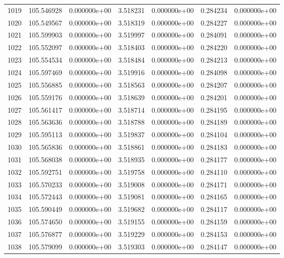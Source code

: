 \begin{tabular}{rrrrrrr}
1019 & 105.546928 &  0.000000e+00 &  3.518231 &  0.000000e+00 &   0.284234 &  0.000000e+00 \\
1020 & 105.549567 &  0.000000e+00 &  3.518319 &  0.000000e+00 &   0.284227 &  0.000000e+00 \\
1021 & 105.599903 &  0.000000e+00 &  3.519997 &  0.000000e+00 &   0.284091 &  0.000000e+00 \\
1022 & 105.552097 &  0.000000e+00 &  3.518403 &  0.000000e+00 &   0.284220 &  0.000000e+00 \\
1023 & 105.554534 &  0.000000e+00 &  3.518484 &  0.000000e+00 &   0.284213 &  0.000000e+00 \\
1024 & 105.597469 &  0.000000e+00 &  3.519916 &  0.000000e+00 &   0.284098 &  0.000000e+00 \\
1025 & 105.556885 &  0.000000e+00 &  3.518563 &  0.000000e+00 &   0.284207 &  0.000000e+00 \\
1026 & 105.559176 &  0.000000e+00 &  3.518639 &  0.000000e+00 &   0.284201 &  0.000000e+00 \\
1027 & 105.561417 &  0.000000e+00 &  3.518714 &  0.000000e+00 &   0.284195 &  0.000000e+00 \\
1028 & 105.563636 &  0.000000e+00 &  3.518788 &  0.000000e+00 &   0.284189 &  0.000000e+00 \\
1029 & 105.595113 &  0.000000e+00 &  3.519837 &  0.000000e+00 &   0.284104 &  0.000000e+00 \\
1030 & 105.565836 &  0.000000e+00 &  3.518861 &  0.000000e+00 &   0.284183 &  0.000000e+00 \\
1031 & 105.568038 &  0.000000e+00 &  3.518935 &  0.000000e+00 &   0.284177 &  0.000000e+00 \\
1032 & 105.592751 &  0.000000e+00 &  3.519758 &  0.000000e+00 &   0.284110 &  0.000000e+00 \\
1033 & 105.570233 &  0.000000e+00 &  3.519008 &  0.000000e+00 &   0.284171 &  0.000000e+00 \\
1034 & 105.572443 &  0.000000e+00 &  3.519081 &  0.000000e+00 &   0.284165 &  0.000000e+00 \\
1035 & 105.590449 &  0.000000e+00 &  3.519682 &  0.000000e+00 &   0.284117 &  0.000000e+00 \\
1036 & 105.574650 &  0.000000e+00 &  3.519155 &  0.000000e+00 &   0.284159 &  0.000000e+00 \\
1037 & 105.576877 &  0.000000e+00 &  3.519229 &  0.000000e+00 &   0.284153 &  0.000000e+00 \\
1038 & 105.579099 &  0.000000e+00 &  3.519303 &  0.000000e+00 &   0.284147 &  0.000000e+00 \\

\end{tabular}
